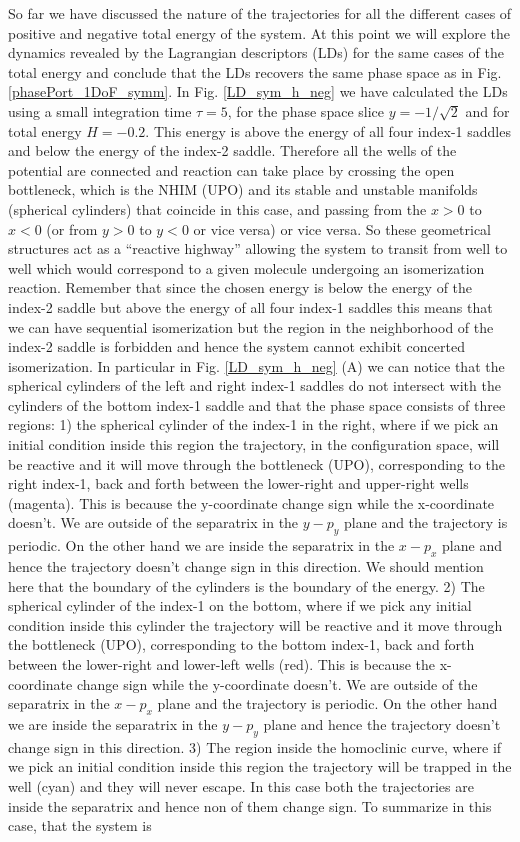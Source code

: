 \documentclass[10pt,aps,onecolumn,superscriptaddress]{revtex4-2}
\begin{document}
So far we have discussed the nature of the trajectories for all the different cases of positive and negative total energy of the system. At this point we will explore the dynamics revealed by the Lagrangian descriptors (LDs) for the same cases of the total energy and conclude that the LDs recovers the same phase space as in Fig. \ref{phasePort_1DoF_symm}. In Fig. \ref{LD_sym_h_neg} we have calculated the LDs using a small integration time $\tau = 5$, for the phase space slice $y = -1/\sqrt{2}$ and for total energy $H = -0.2$. This energy is above the energy of all four index-1 saddles and below the energy of the index-2 saddle. Therefore all the wells of the potential are connected and reaction can take place by crossing the open bottleneck, which is the NHIM (UPO) and its stable and unstable manifolds (spherical cylinders) that coincide in this case, and passing from the $x>0$ to $x<0$ (or from $y>0$ to $y<0$ or vice versa) or vice versa. So these geometrical structures act as a ``reactive highway'' allowing the system to transit from well to well which would correspond to a given molecule undergoing an isomerization reaction. Remember that since the chosen energy is below the energy of the index-2 saddle but above the energy of all four index-1 saddles  this means that we can have sequential isomerization but the region in the neighborhood of the index-2 saddle is forbidden and hence the system cannot exhibit concerted isomerization. In particular in Fig. \ref{LD_sym_h_neg} (A) we can notice that the spherical cylinders of the left and right index-1 saddles do not intersect with the cylinders of the bottom index-1 saddle and that the phase space consists of three regions: 1) the spherical cylinder of the index-1 in the right, where if we pick an initial condition inside this region the trajectory, in the configuration space, will be reactive and it will move through the bottleneck (UPO), corresponding to the right index-1, back and forth between the lower-right and upper-right wells (magenta). This is because the y-coordinate change sign while the x-coordinate doesn't. We are outside of the separatrix in the $y-p_{y}$ plane and the trajectory is periodic. On the other hand we are inside the separatrix in the $x-p_{x}$ plane and hence the trajectory doesn't change sign in this direction. We should mention here that the boundary of the cylinders is the boundary of the energy. 2) The spherical cylinder of the index-1 on the bottom, where if we pick any initial condition inside this cylinder the trajectory will be reactive and it move through the bottleneck (UPO), corresponding to the bottom index-1, back and forth between the lower-right and lower-left wells (red). This is because the x-coordinate change sign while the y-coordinate doesn't. We are outside of the separatrix in the $x-p_{x}$ plane and the trajectory is periodic. On the other hand we are inside the separatrix in the $y-p_{y}$ plane and hence the trajectory doesn't change sign in this direction. 3) The region inside the homoclinic curve, where if we pick an initial condition inside this region the trajectory will be trapped in the well (cyan) and they will never escape. In this case both the trajectories are inside the separatrix and hence non of them change sign. To summarize in this case, that the system is 
\end{document}
